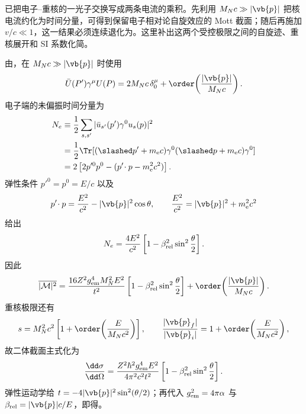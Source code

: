 \begin{exbox}
\medskip

 已把电子--重核的一光子交换写成两条电流的乘积。先利用 $M_Nc\gg|\vb{p}|$ 把核电流约化为时间分量，可得到保留电子相对论自旋效应的 Mott 截面；随后再施加 $v/c\ll1$，这一结果必须连续退化为。这里补出这两个受控极限之间的自旋迹、重核展开和 SI 系数化简。



由，在 $M_Nc\gg|\vb{p}|$ 时使用
\begin{equation*}
 \bar U(P')\gamma^\mu U(P)
 =2M_Nc\,\delta_0^\mu
 +\order\!\left(\frac{|\vb{p}|}{M_Nc}\right).
\end{equation*}
电子端的未偏振时间分量为
\begin{align*}
 N_e
 &\equiv\frac12\sum_{s,s'}
 |\bar u_{s'}(p')\gamma^0u_s(p)|^2\\
 &=\frac12\Tr[(\slashed p'+m_{\mathrm e} c)\gamma^0
 (\slashed p+m_{\mathrm e} c)\gamma^0]\\
 &=2\left[2p'^0p^0-(p'\!\cdot p-m_{\mathrm e}^2c^2)\right].
\end{align*}
弹性条件 $p'^0=p^0=E/c$ 以及
\begin{equation*}
 p'\!\cdot p=\frac{E^2}{c^2}-|\vb{p}|^2\cos\theta,
 \qquad
 \frac{E^2}{c^2}=|\vb{p}|^2+m_{\mathrm e}^2c^2
\end{equation*}
给出
\begin{equation*}
 N_e
 =\frac{4E^2}{c^2}
 \left[1-\beta_{\rm rel}^2\sin^2\frac\theta2\right].
\end{equation*}
因此
\begin{equation*}
 \overline{|\mathcal M|^2}
 =\frac{16Z^2g_{\rm em}^4M_N^2E^2}{t^2}
 \left[1-\beta_{\rm rel}^2\sin^2\frac\theta2\right]
 +\order\!\left(\frac{|\vb{p}|}{M_Nc}\right).
\end{equation*}
重核极限还有
\begin{equation*}
 s=M_N^2c^2\left[1+\order\!\left(\frac{E}{M_Nc^2}\right)\right],
 \qquad
 \frac{|\vb{p}_f|}{|\vb{p}_i|}=1+\order\!\left(\frac{E}{M_Nc^2}\right),
\end{equation*}
故二体截面主式化为
\begin{equation*}
 \frac{\dd\sigma}{\dd\Omega}
 =\frac{Z^2\hbar^2g_{\rm em}^4E^2}
 {4\pi^2c^2t^2}
 \left[1-\beta_{\rm rel}^2\sin^2\frac\theta2\right].
\end{equation*}
弹性运动学给 $t=-4|\vb{p}|^2\sin^2(\theta/2)$；再代入 $g_{\rm em}^2=4\pi\alpha$ 与 $\beta_{\rm rel}=|\vb{p}|c/E$，即得。


\end{exbox}
